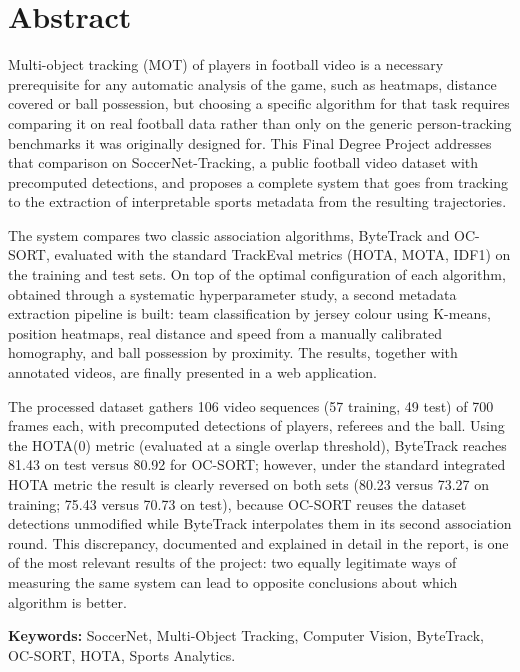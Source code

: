\chapter*{Abstract}

Multi-object tracking (MOT) of players in football video is a necessary
prerequisite for any automatic analysis of the game, such as heatmaps,
distance covered or ball possession, but choosing a specific algorithm for
that task requires comparing it on real football data rather than only on
the generic person-tracking benchmarks it was originally designed for.
This Final Degree Project addresses that comparison on SoccerNet-Tracking,
a public football video dataset with precomputed detections, and proposes
a complete system that goes from tracking to the extraction of
interpretable sports metadata from the resulting trajectories.

The system compares two classic association algorithms, ByteTrack and
OC-SORT, evaluated with the standard TrackEval metrics (HOTA, MOTA, IDF1)
on the training and test sets. On top of the optimal configuration of each
algorithm, obtained through a systematic hyperparameter study, a second
metadata extraction pipeline is built: team classification by jersey
colour using K-means, position heatmaps, real distance and speed from a
manually calibrated homography, and ball possession by proximity. The
results, together with annotated videos, are finally presented in a web
application.

The processed dataset gathers 106 video sequences (57 training, 49 test)
of 700 frames each, with precomputed detections of players, referees and
the ball. Using the HOTA(0) metric (evaluated at a single overlap
threshold), ByteTrack reaches 81.43 on test versus 80.92 for OC-SORT;
however, under the standard integrated HOTA metric the result is clearly
reversed on both sets (80.23 versus 73.27 on training; 75.43 versus 70.73
on test), because OC-SORT reuses the dataset detections unmodified while
ByteTrack interpolates them in its second association round. This
discrepancy, documented and explained in detail in the report, is one of
the most relevant results of the project: two equally legitimate ways of
measuring the same system can lead to opposite conclusions about which
algorithm is better.

\vspace{.5cm}

\textbf{Keywords:} SoccerNet, Multi-Object Tracking, Computer Vision,
ByteTrack, OC-SORT, HOTA, Sports Analytics.

